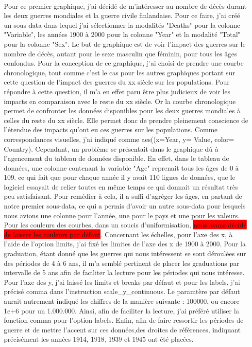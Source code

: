 \documentclass{article}
\newcommand{\hilight}[1]{\colorbox{red}{#1}}
\begin{document}
\paragraph{}
Pour ce premier graphique, j'ai décidé de m'intéresser au nombre de décès durant les deux guerres mondiales et la guerre civile finlandaise. Pour ce faire, j'ai créé un sous-data dans lequel j'ai sélectionner la modalités "Deaths" pour la colonne "Variable", les années 1900 à 2000 pour la colonne "Year" et la modalité "Total" pour la colonne "Sex". Le but de graphique est de voir l'impact des guerres sur le nombre de décès, autant pour le sexe masculin que féminin, pour tous les âges confondus. Pour la conception de ce graphique, j'ai choisi de prendre une courbe chronologique, tout comme c'est le cas pour les autres graphiques portant sur cette question de l'impact des guerres du xx siècle sur les populations. Pour répondre à cette question, il m'a en effet paru être plus judicieux de voir les impacts en comparaison avec le reste du xx siècle. Or la courbe chronologique permet de confronter les données disponibles pour les deux guerres mondiales à celles du reste du xx siècle. Elle permet donc de prendre pleinement conscience de l'étendue des impacts qu'ont eu ces guerres sur les populations. Comme correspondances visuelles, j'ai indiqué comme aes((x=Year, y= Value, color= Country). Cependant, un problème se présentait dans le graphique dû à l'agencement du tableau de données disponible. En effet, dans le tableau de données, une colonne contenant la variable "Age" reprenait tous les âges de 0 à 109. ce qui fait que pour chaque année il y avait 110 lignes de données, que le logiciel essayait de relier toutes en même temps ce qui donnait un résultat très peu satisfaisant. Pour remédier à cela, il a suffi d'agréger les âges, en partant de notre premier sous-data, ce qui a permis d'avoir un autre sous-data pour lesquels nous avions une colonne pour l'année, une pour le pays et une pour les valeurs. Pour les couleurs des courbes, dans un soucis d'uniformisation, \hilight{nous avons décidé de laisser les couleurs par défaut}. Concernant les échelles, pour l'axe des x, à l'aide de l'option limits, j'ai fixé les limites de l'axe des x de 1900 à 2000. Pour la graduation, étant donné que les guerres qui nous intéressent se sont déroulées sur des périodes de 4 à 6 ans, il m'a semblé pertinent de placer les graduations par intervalle de 5 ans afin de faciliter la lecture pour les périodes qui nous intéresse. Pour l'axe des y, j'ai laissé les limits et breaks par défaut et pour les labels, j'ai précisé comma dans l'instruction scale\_y\_continuous. Le paramtère par défaut aurait autrement indiqué les chiffres de la manière suivante : 100000, ou encore 1e+6 pour un 1.000.000. Ainsi, afin de faciliter la lecture, j'ai préféré utiliser la fonction comma pour l'option labels. Enfin, afin de faire ressortir les périodes de guerre et de mettre l'accent sur ces données,des droites de références, indiquant précisément les années 1914, 1918, 1939 et 1945 ont été placées. 
\end{document}

